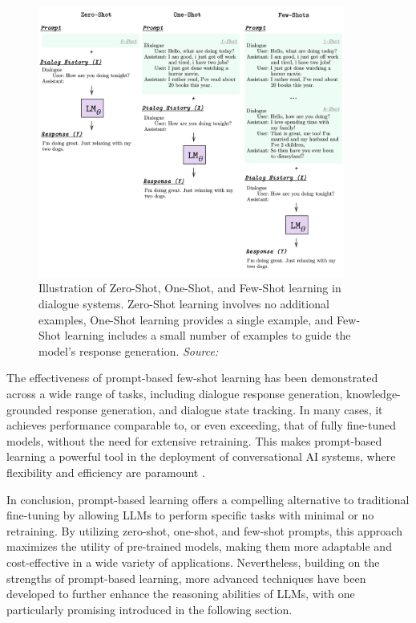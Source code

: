 \begin{figure}[h]
    \centering
    \includegraphics[width=0.9\textwidth]{images/llms/zero-one-few-shots.png}
    \caption{Illustration of Zero-Shot, One-Shot, and Few-Shot learning in dialogue systems. Zero-Shot learning involves no additional examples, One-Shot learning provides a single example, and Few-Shot learning includes a small number of examples to guide the model's response generation. \textit{Source:} \cite{madotto2021few}}
    \label{fig:zero_one_few_shot}
\end{figure}

The effectiveness of prompt-based few-shot learning has been demonstrated across a wide range of tasks, including dialogue response generation, knowledge-grounded response generation, and dialogue state tracking. In many cases, it achieves performance comparable to, or even exceeding, that of fully fine-tuned models, without the need for extensive retraining. This makes prompt-based learning a powerful tool in the deployment of conversational AI systems, where flexibility and efficiency are paramount \cite{madotto2021few}.

In conclusion, prompt-based learning offers a compelling alternative to traditional fine-tuning by allowing LLMs to perform specific tasks with minimal or no retraining. By utilizing zero-shot, one-shot, and few-shot prompts, this approach maximizes the utility of pre-trained models, making them more adaptable and cost-effective in a wide variety of applications. Nevertheless, building on the strengths of prompt-based learning, more advanced techniques have been developed to further enhance the reasoning abilities of LLMs, with one particularly promising introduced in the following section.

